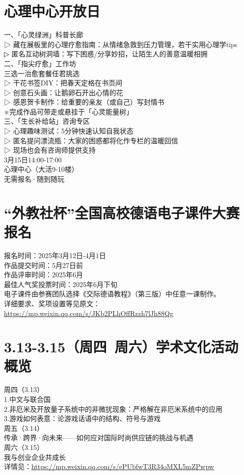 \documentclass[letterpaper, 12pt]{article}
\begin{document}
\begin{multicols}{2}
\section{心理中心开放日}
一、「心灵绿洲」科普长廊\\
▷ 藏在展板里的心理疗愈指南：从情绪急救到压力管理，若干实用心理学tips\\
▷ 匿名互动树洞墙：写下困惑/分享妙招，让陌生人的善意温暖相拥\\
二、「指尖疗愈」工作坊\\
三选一治愈套餐任君挑选\\
▷ 干花书签DIY：把春天定格在书页间\\
▷ 创意石头画：让鹅卵石开出心情的花\\
▷ 感恩贺卡制作：给重要的亲友（或自己）写封情书\\
※完成作品可带走或悬挂于「心灵能量树」\\
三、「生长补给站」咨询专区\\
▷ 心理趣味测试：5分钟快速认知自我状态\\
▷ 匿名提问漂流瓶：大家的困惑都将化作专栏的温暖回信\\
▷ 现场也会有咨询师提供支持\\
3月15日14:00-17:00\\
心理中心（大活9-10楼）\\
无需报名·随到随玩\\

\section{“外教社杯”全国高校德语电子课件大赛报名}
报名时间：2025年3月12日-4月1日\\
作品提交时间：5月27日前\\
作品评审时间：2025年6月\\
最佳人气奖投票时间：2025年6月下旬\\
电子课件由参赛团队选择《交际德语教程》（第三版）中任意一课制作。\\
详细要求、奖项设置等见原文：\url{https://mp.weixin.qq.com/s/JKb2PLhOffRzzh7lJh88Qg}

\section{3.13-3.15（周四~周六）学术文化活动概览}
周四（3.13）\\
1.中文与联合国\\
2.非厄米及开放量子系统中的非微扰现象：严格解在非厄米系统中的应用\\
3.游戏如何表意：论游戏话语中的结构、符号与游戏\\
周五（3.14）\\
传承·跨界·向未来——如何应对国际时尚供应链的挑战与机遇\\
周六（3.15）\\
我与创业企业共成长\\
详情见：\url{https://mp.weixin.qq.com/s/ePUbfwT3R34oMXL5mZPwpw}



\end{multicols}
\end{document}
